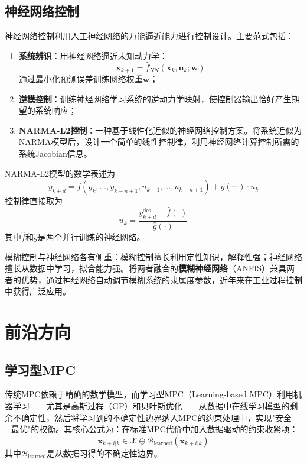 \subsection{神经网络控制}

神经网络控制利用人工神经网络的万能逼近能力进行控制设计。主要范式包括：

\begin{enumerate}
\item \textbf{系统辨识}：用神经网络逼近未知动力学：
\[
\mathbf{x}_{k+1} = \hat{f}_{NN}(\mathbf{x}_k, \mathbf{u}_k; \mathbf{w})
\]
通过最小化预测误差训练网络权重\(\mathbf{w}\)；
\item \textbf{逆模控制}：训练神经网络学习系统的逆动力学映射，使控制器输出恰好产生期望的系统响应；
\item \textbf{NARMA-L2控制}：一种基于线性化近似的神经网络控制方案。将系统近似为NARMA模型后，设计一个简单的线性控制律，利用神经网络计算控制所需的系统Jacobian信息。
\end{enumerate}

NARMA-L2模型的数学表述为
\[
y_{k+d} = f(y_k, \dots, y_{k-n+1}, u_{k-1}, \dots, u_{k-n+1}) + g(\cdots) \cdot u_k
\]
控制律直接取为
\[
u_k = \frac{y_{k+d}^{\text{des}} - \hat{f}(\cdot)}{\hat{g}(\cdot)}
\]
其中\(\hat{f}\)和\(\hat{g}\)是两个并行训练的神经网络。

\begin{remark}
模糊控制与神经网络各有侧重：模糊控制擅长利用定性知识，解释性强；神经网络擅长从数据中学习，拟合能力强。将两者融合的\textbf{模糊神经网络}（ANFIS）兼具两者的优势，通过神经网络自动调节模糊系统的隶属度参数，近年来在工业过程控制中获得广泛应用。
\end{remark}

\section{前沿方向}

\subsection{学习型MPC}

传统MPC依赖于精确的数学模型，而学习型MPC（Learning-based MPC）利用机器学习——尤其是高斯过程（GP）和贝叶斯优化——从数据中在线学习模型的剩余不确定性，然后将学习到的不确定性边界纳入MPC的约束处理中，实现"安全+最优"的权衡。其核心公式为：在标准MPC代价中加入数据驱动的约束收紧项：
\[
\mathbf{x}_{k+i|k} \in \mathcal{X} \ominus \mathcal{B}_{\text{learned}}(\mathbf{x}_{k+i|k})
\]
其中\(\mathcal{B}_{\text{learned}}\)是从数据习得的不确定性边界。

